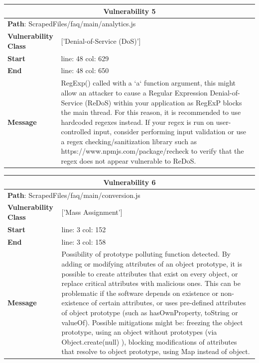 \documentclass[12pt]{article}
\begin{document}
\vspace{0.7cm}
\FloatBarrier
\begin{table}[!h]
\centering
\renewcommand{\arraystretch}{1.3}
\begin{tabular}{|l|p{10cm}|}
\hline
\multicolumn{2}{|c|}{\textbf{Vulnerability 5}} \\
\hline
\multicolumn{2}{|l|}{\textbf{Path}: ScrapedFiles/faq/main/analytics.js} \\
\hline
\textbf{Vulnerability Class} & ['Denial-of-Service (DoS)'] \\
\hline
\textbf{Start} & line: 48 \quad col: 629 \\
\hline
\textbf{End} & line: 48 \quad col: 650 \\
\hline
\textbf{Message} & RegExp() called with a `a` function argument, this might allow an attacker to cause a Regular Expression Denial-of-Service (ReDoS) within your application as RegExP blocks the main thread. For this reason, it is recommended to use hardcoded regexes instead. If your regex is run on user-controlled input, consider performing input validation or use a regex checking/sanitization library such as https://www.npmjs.com/package/recheck to verify that the regex does not appear vulnerable to ReDoS. \\
\hline
\end{tabular}
\end{table}
\vspace{0.7cm}
\FloatBarrier
\begin{table}[!h]
\centering
\renewcommand{\arraystretch}{1.3}
\begin{tabular}{|l|p{10cm}|}
\hline
\multicolumn{2}{|c|}{\textbf{Vulnerability 6}} \\
\hline
\multicolumn{2}{|l|}{\textbf{Path}: ScrapedFiles/faq/main/conversion.js} \\
\hline
\textbf{Vulnerability Class} & ['Mass Assignment'] \\
\hline
\textbf{Start} & line: 3 \quad col: 152 \\
\hline
\textbf{End} & line: 3 \quad col: 158 \\
\hline
\textbf{Message} & Possibility of prototype polluting function detected. By adding or modifying attributes of an object prototype, it is possible to create attributes that exist on every object, or replace critical attributes with malicious ones. This can be problematic if the software depends on existence or non-existence of certain attributes, or uses pre-defined attributes of object prototype (such as hasOwnProperty, toString or valueOf). Possible mitigations might be: freezing the object prototype, using an object without prototypes (via Object.create(null) ), blocking modifications of attributes that resolve to object prototype, using Map instead of object. \\
\hline
\end{tabular}
\end{table}
\end{document}
